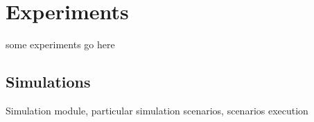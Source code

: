 \chapter{Experiments}\label{c:experiments}

some experiments go here



\section{Simulations}
Simulation module, particular simulation scenarios, scenarios execution